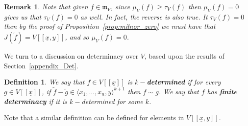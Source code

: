 \documentclass{article}
\newtheorem{definition}[theorem]{Definition}
\newtheorem{remark}[theorem]{Remark}
\newcommand{\maxV}{\mathfrak{m}_V}
\newcommand{\Vx}{V[[\underline{x}]]}
\newcommand{\Vxy}{V[[\underline{x},y]]}
\numberwithin{theorem}{section}
\begin{document}
\begin{remark}\label{rem:smooth}
    \textup{Note that given $f \in \maxV$, since $\mu_V\left(f\right) \geq \tau_V\left(f\right)$ then $\mu_V\left(f\right)=0$ gives us that $\tau_V\left(f\right)=0$ as well. In fact, the reverse is also true. It $\tau_V\left(f\right)=0$ then by the proof of Proposition~\ref{prop:milnor_zero} we must have that $J(\tilde{f})=\Vxy$, and so $\mu_V(f)=0$.}
\end{remark}


We turn to a discussion on determinacy over $V$, based upon the results of Section~\ref{appendix_Det}. 

\begin{definition}\label{def:det_V}
      We say that $f \in \Vx$ is \textbf{$k-$determined} if for every $g \in \Vx$, if $\tilde{f} - \tilde{g} \in \langle x_1, \dots, x_n, y \rangle^{k+1}$ then $f \sim g$. We say that $f$ has \textbf{finite determinacy} if it is $k-$determined for some $k$.  
\end{definition}

Note that a similar definition can be defined for elements in $\Vxy$. 
\end{document}
